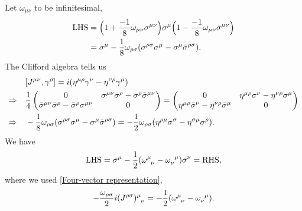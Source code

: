 \begin{framed}
    Let $\omega_{\mu \nu}$ to be infinitesimal,
    \begin{align}
        \text{LHS} &= \Big( 1 + \frac{- 1}{8} \omega_{\mu \nu} \sigma^{\mu \nu} \Big) \sigma^\mu \Big( 1 - \frac{- 1}{8} \omega_{\mu \nu} \bar{\sigma}^{\mu \nu} \Big) \notag \\
        &= \sigma^\mu - \frac{1}{8} \omega_{\rho \sigma} (\sigma^{\rho \sigma} \sigma^\mu - \sigma^\mu \bar{\sigma}^{\rho \sigma}).
    \end{align}
    The Clifford algebra tells us
    \begin{align}
        & [J^{\mu \nu}, \gamma^\rho] = i (\eta^{\mu \rho} \gamma^\nu - \eta^{\nu \rho} \gamma^\mu) \notag \\
        \Rightarrow \quad & \frac{1}{4} \begin{pmatrix}
            0 & \sigma^{\mu \nu} \sigma^\rho - \sigma^\rho \bar{\sigma}^{\mu \nu} \\
            \bar{\sigma}^{\mu \nu} \bar{\sigma}^\rho - \bar{\sigma}^\rho \sigma^{\mu \nu} & 0
        \end{pmatrix} = \begin{pmatrix}
            0 & \eta^{\mu \rho} \sigma^\nu - \eta^{\nu \rho} \sigma^\mu \\
            \eta^{\mu \rho} \bar{\sigma}^\nu - \eta^{\nu \rho} \bar{\sigma}^\mu & 0
        \end{pmatrix} \notag \\
        \Rightarrow \quad & - \frac{1}{8} \omega_{\rho \sigma} (\sigma^{\rho \sigma} \sigma^\mu - \sigma^\mu \bar{\sigma}^{\rho \sigma}) = - \frac{1}{2} \omega_{\rho \sigma} (\eta^{\rho \mu} \sigma^\sigma - \eta^{\sigma \mu} \sigma^\rho).
    \end{align}
    We have
    \begin{equation}
        \text{LHS} = \sigma^\mu - \frac{1}{2} (\tensor{\omega}{^\mu_\nu} - \tensor{\omega}{_\nu^\mu}) \sigma^\nu = \text{RHS},
    \end{equation}
    where we used \eqref{Four-vector representation},
    \begin{equation}
        - \frac{\omega_{\rho \sigma}}{2} i \tensor{(J^{\rho \sigma})}{^\mu_\nu} = - \frac{1}{2} (\tensor{\omega}{^\mu_\nu} - \tensor{\omega}{_\nu^\mu}).
    \end{equation}
\end{framed}
